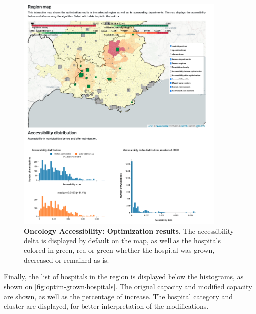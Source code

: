\begin{figure}[H]
    \includegraphics[width=0.9\textwidth]{images/oncology-accessibility/optim-paca-map.png}
    \centering
    \caption{ \textbf{Oncology Accessibility: Optimization results.}  The
        accessibility delta is displayed by default on the map, as well as the
        hospitals colored in green, red or green whether the hospital was grown,
        decreased or remained as is. }
    \label{fig:optim-results}
\end{figure}

Finally, the list of hospitals in the region is displayed below the histograms,
as shown on \cref{fig:optim-grown-hospitals}. The orignal capacity and modified
capacity are shown, as well as the percentage of increase. The hospital category
and cluster are displayed, for better interpretation of the modifications.


